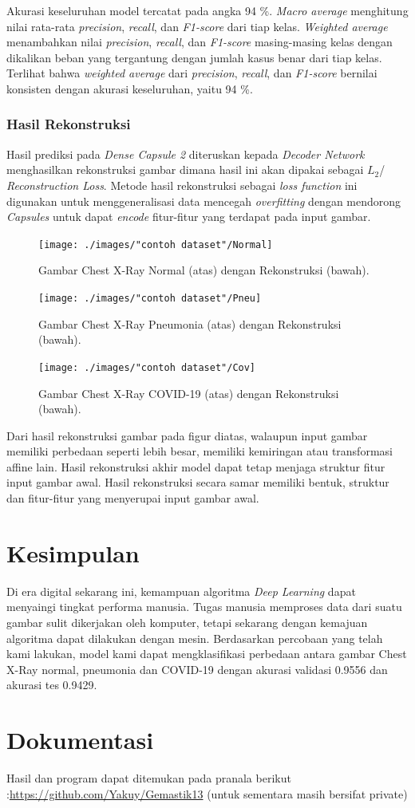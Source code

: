\documentclass{article}
\begin{document}
   			\par Akurasi keseluruhan model tercatat pada angka 94 \%. \textit{Macro average} menghitung nilai rata-rata \textit{precision}, \textit{recall}, dan \textit{F1-score} dari tiap kelas. \textit{Weighted average} menambahkan nilai \textit{precision}, \textit{recall}, dan \textit{F1-score} masing-masing kelas dengan dikalikan beban yang tergantung dengan jumlah kasus benar dari tiap kelas. Terlihat bahwa \textit{weighted average} dari \textit{precision}, \textit{recall}, dan \textit{F1-score} bernilai konsisten dengan akurasi keseluruhan, yaitu 94 \%.
   		
   		\subsubsection{Hasil Rekonstruksi}
		\par
		Hasil prediksi pada \textit{Dense Capsule 2} diteruskan kepada \textit{Decoder Network} menghasilkan rekonstruksi gambar dimana hasil ini akan dipakai sebagai $L_{2}$/ \textit{Reconstruction Loss}. Metode hasil rekonstruksi sebagai \textit{loss function} ini digunakan untuk menggeneralisasi data mencegah \textit{overfitting} dengan mendorong \textit{Capsules} untuk dapat \textit{encode} fitur-fitur yang terdapat pada input gambar.
		\begin{figure}[H]
			\centering
			\texttt{[image: ./images/"contoh dataset"/Normal]}
			\caption{Gambar Chest X-Ray Normal (atas) dengan Rekonstruksi (bawah).}
		\end{figure}
		\begin{figure}[H]
			\centering
			\texttt{[image: ./images/"contoh dataset"/Pneu]}
			\caption{Gambar Chest X-Ray Pneumonia (atas) dengan Rekonstruksi (bawah).}
		\end{figure}
		\begin{figure}[H]
			\centering
			\texttt{[image: ./images/"contoh dataset"/Cov]}
			\caption{Gambar Chest X-Ray COVID-19 (atas) dengan Rekonstruksi (bawah).}
		\end{figure}
		\par
		Dari hasil rekonstruksi gambar pada figur diatas, walaupun input gambar memiliki perbedaan seperti lebih besar, memiliki kemiringan atau transformasi affine lain. Hasil rekonstruksi akhir model dapat tetap menjaga struktur fitur input gambar awal. Hasil rekonstruksi secara samar memiliki bentuk, struktur dan fitur-fitur yang menyerupai input gambar awal.
   \newpage
   \section{Kesimpulan}
    Di era digital sekarang ini, kemampuan algoritma \textit{Deep Learning} dapat menyaingi tingkat performa manusia. Tugas manusia memproses data dari suatu gambar sulit dikerjakan oleh komputer, tetapi sekarang dengan kemajuan algoritma dapat dilakukan dengan mesin. Berdasarkan percobaan yang telah kami lakukan, model kami dapat mengklasifikasi perbedaan antara gambar Chest X-Ray normal, pneumonia dan COVID-19 dengan akurasi validasi 0.9556 dan akurasi tes 0.9429.
   
   \section{Dokumentasi}
   Hasil dan program dapat ditemukan pada pranala berikut :\url{https://github.com/Yakuy/Gemastik13} (untuk sementara masih bersifat private)
   \newpage
   \printbibliography[title=Daftar Pustaka]
\end{document}
